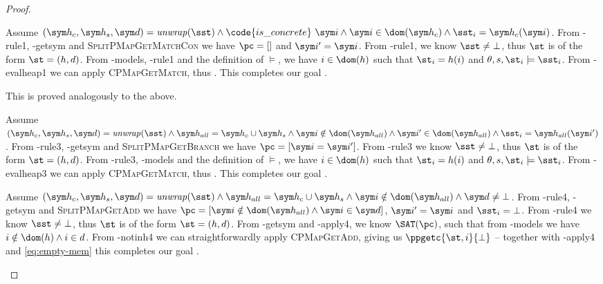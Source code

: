 \begin{proof}
\begin{hypvlist}
 Assume $(\sym h_c,\sym h_s,\sym d)=\mathit{unwrap}(\sst) \land \code{is\_concrete}~\sym i \land \sym i\in\dom(\sym h_c) \land \sst_{i}=\sym h_c(\sym i)$.
 From \hyp{rule1}, \hyp{getsym} and \textsc{SplitPMapGetMatchCon} we have $\pc=[]$ and $\sym i'=\sym i$.
 From \hyp{rule1}, we know $\sst\neq\bot$, thus $\st$ is of the form $\st=(h,d)$.
 From \hyp{models}, \hyp{rule1} and the definition of $\models$, we have $i\in \dom(h)$ such that $\st_i=h(i)$ and ${\theta,s,\st_i\models\sst_i}$.
 From \hyp{evalheap1} we can apply \textsc{CPMapGetMatch}, thus . This completes our goal .
\end{hypvlist}

 This is proved analogously to the above.


\begin{hypvlist}
 Assume $(\sym h_c,\sym h_s,\sym d)=\mathit{unwrap}(\sst) \land \sym h_{all}=\sym h_c\cup \sym h_s \land \sym i\notin \dom(\sym h_{all}) \land \sym i'\in\dom(\sym h_{all}) \land {\sst_i=\sym h_{all}(\sym i')}$.
 From \hyp{rule3}, \hyp{getsym} and \textsc{SplitPMapGetBranch} we have $\pc=[\sym i = \sym i']$.
 From \hyp{rule3} we know $\sst\neq\bot$, thus $\st$ is of the form $\st=(h,d)$.
 From \hyp{rule3}, \hyp{models} and the definition of $\models$, we have $i\in \dom(h)$  such that $\st_i=h(i)$ and ${\theta,s,\st_i\models\sst_i}$.
 From \hyp{evalheap3} we can apply \textsc{CPMapGetMatch}, thus . This completes our goal .
\end{hypvlist}


\begin{hypvlist}
 Assume $(\sym h_c,\sym h_s,\sym d)=\mathit{unwrap}(\sst) \land \sym h_{all}=\sym h_c\cup \sym h_s \land \sym i\notin\dom(\sym h_{all}) \land \sym d\neq\bot$.
 From \hyp{rule4}, \hyp{getsym} and \textsc{SplitPMapGetAdd} we have $\pc=[\sym i\notin\dom(\sym h_{all}) \land \sym i\in \sym d]$, $\sym i'=\sym i$ and $\sst_i=\bot$.
 From \hyp{rule4} we know $\sst\neq\bot$, thus $\st$ is of the form $\st=(h,d)$.
 From \hyp{getsym} and \hyp{apply4}, we know $\SAT(\pc)$, such that from \hyp{models} we have ${i\notin \dom(h)} \land {i\in d}$.
 From \hyp{notinh4} we can straightforwardly apply \textsc{CPMapGetAdd}, giving us $\ppgetc{\st,i}{\bot}$ -- together with \hyp{apply4} and \ref{eq:empty-mem} this completes our goal .
\end{hypvlist}


\end{proof}
